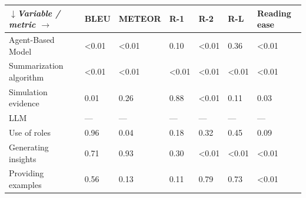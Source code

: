 \begin{tabular}{|l|l|l|l|l|l|l|}
\hline
\textit{$\downarrow$Variable / metric $\rightarrow$} & BLEU & METEOR & R-1 & R-2 & R-L & Reading ease \\
 \hline
 Agent-Based Model & \textless{}0.01 & \textless{}0.01 & 0.10 & \textless{}0.01 & 0.36 & \textless{}0.01 \\
 \hline
 Summarization algorithm & \textless{}0.01 & \textless{}0.01 & \textless{}0.01 & \textless{}0.01 & \textless{}0.01 & \textless{}0.01 \\
 \hline
 Simulation evidence & 0.01 & 0.26 & 0.88 & \textless{}0.01 & 0.11 & 0.03 \\
 \hline
 LLM & — & — & — & — & — & — \\
 \hline
 Use of roles & 0.96 & 0.04 & 0.18 & 0.32 & 0.45 & 0.09 \\
 \hline
 Generating insights & 0.71 & 0.93 & 0.30 & \textless{}0.01 & \textless{}0.01 & \textless{}0.01 \\
 \hline
 Providing examples & 0.56 & 0.13 & 0.11 & 0.79 & 0.73 & \textless{}0.01 \\
\hline
\end{tabular}
